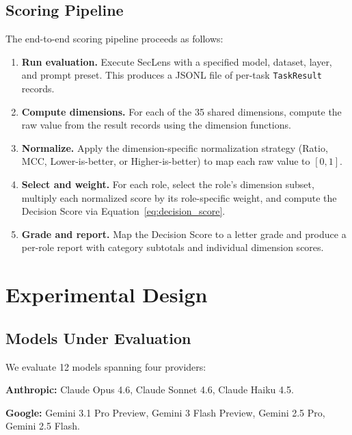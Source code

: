 \documentclass[10pt,twocolumn]{article}
\newcommand{\seclens}{SecLens\xspace}
\begin{document}
\subsection{Scoring Pipeline}
\label{sec:pipeline}

The end-to-end scoring pipeline proceeds as follows:

\begin{enumerate}[noitemsep,topsep=2pt]
    \item \textbf{Run evaluation.} Execute \seclens with a specified model, dataset, layer, and prompt preset. This produces a JSONL file of per-task \texttt{TaskResult} records.
    \item \textbf{Compute dimensions.} For each of the 35 shared dimensions, compute the raw value from the result records using the dimension functions.
    \item \textbf{Normalize.} Apply the dimension-specific normalization strategy (Ratio, MCC, Lower-is-better, or Higher-is-better) to map each raw value to $[0, 1]$.
    \item \textbf{Select and weight.} For each role, select the role's dimension subset, multiply each normalized score by its role-specific weight, and compute the Decision Score via Equation~\ref{eq:decision_score}.
    \item \textbf{Grade and report.} Map the Decision Score to a letter grade and produce a per-role report with category subtotals and individual dimension scores.
\end{enumerate}

\section{Experimental Design}
\label{sec:experiments}

\subsection{Models Under Evaluation}
\label{sec:models}

We evaluate 12 models spanning four providers:

\textbf{Anthropic:} Claude Opus 4.6, Claude Sonnet 4.6, Claude Haiku 4.5.

\textbf{Google:} Gemini 3.1 Pro Preview, Gemini 3 Flash Preview, Gemini 2.5 Pro, Gemini 2.5 Flash.
\end{document}
